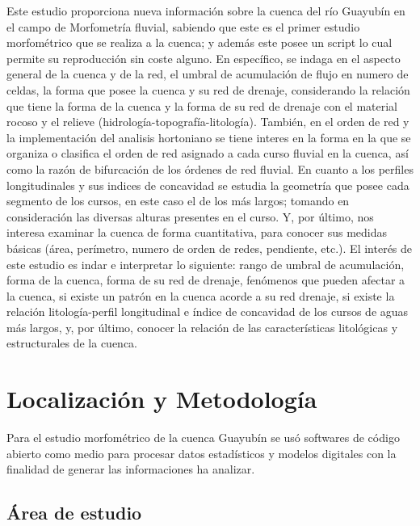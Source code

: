 \documentclass[11pt,]{article}
\begin{document}
Este estudio proporciona nueva información sobre la cuenca del río
Guayubín en el campo de Morfometría fluvial, sabiendo que este es el
primer estudio morfométrico que se realiza a la cuenca; y además este
posee un script lo cual permite su reproducción sin coste alguno. En
específico, se indaga en el aspecto general de la cuenca y de la red, el
umbral de acumulación de flujo en numero de celdas, la forma que posee
la cuenca y su red de drenaje, considerando la relación que tiene la
forma de la cuenca y la forma de su red de drenaje con el material
rocoso y el relieve (hidrología-topografía-litología). También, en el
orden de red y la implementación del analisis hortoniano se tiene
interes en la forma en la que se organiza o clasifica el orden de red
asignado a cada curso fluvial en la cuenca, así como la razón de
bifurcación de los órdenes de red fluvial. En cuanto a los perfiles
longitudinales y sus indices de concavidad se estudia la geometría que
posee cada segmento de los cursos, en este caso el de los más largos;
tomando en consideración las diversas alturas presentes en el curso. Y,
por último, nos interesa examinar la cuenca de forma cuantitativa, para
conocer sus medidas básicas (área, perímetro, numero de orden de redes,
pendiente, etc.). El interés de este estudio es indar e interpretar lo
siguiente: rango de umbral de acumulación, forma de la cuenca, forma de
su red de drenaje, fenómenos que pueden afectar a la cuenca, si existe
un patrón en la cuenca acorde a su red drenaje, si existe la relación
litología-perfil longitudinal e índice de concavidad de los cursos de
aguas más largos, y, por último, conocer la relación de las
características litológicas y estructurales de la cuenca.

\section{Localización y
Metodología}\label{localizaciuxf3n-y-metodologuxeda}

Para el estudio morfométrico de la cuenca Guayubín se usó softwares de
código abierto como medio para procesar datos estadísticos y modelos
digitales con la finalidad de generar las informaciones ha analizar.

\subsection{Área de estudio}\label{uxe1rea-de-estudio}
\end{document}

